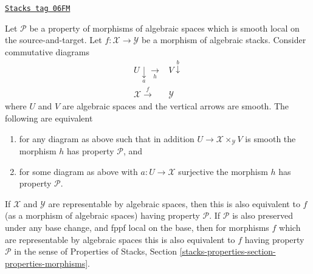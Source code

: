 \begin{lemma}
\label{stacks-morphisms-lemma-local-source-target}
\href{https://stacks.math.columbia.edu/tag/06FM}{\texttt{Stacks tag 06FM}}

Let $\mathcal{P}$ be a property of morphisms of algebraic spaces
which is smooth local on the source-and-target.
Let $f : \mathcal{X} \to \mathcal{Y}$ be a morphism of algebraic stacks.
Consider commutative diagrams
$$
\begin{array}{cc}U \underset{a}{\downarrow}\underset{h}{\longrightarrow} & V \overset{b}{\downarrow} \\ \mathcal{X} \overset{f}{\longrightarrow} & \mathcal{Y}\end{array}
$$
where $U$ and $V$ are algebraic spaces and the vertical arrows are smooth.
The following are equivalent
\begin{enumerate}
\item for any diagram as above such that in addition
$U \to \mathcal{X} \times_\mathcal{Y} V$ is smooth
the morphism $h$ has property $\mathcal{P}$, and
\item for some diagram as above with $a : U \to \mathcal{X}$ surjective
the morphism $h$ has property $\mathcal{P}$.
\end{enumerate}
If $\mathcal{X}$ and $\mathcal{Y}$ are representable by algebraic spaces,
then this is also equivalent to $f$ (as a morphism of algebraic spaces)
having property $\mathcal{P}$. If $\mathcal{P}$ is also preserved under
any base change, and fppf local on the base, then for morphisms $f$
which are representable by algebraic spaces this
is also equivalent to $f$ having property $\mathcal{P}$ in the sense
of
Properties of Stacks,
Section \ref{stacks-properties-section-properties-morphisms}.
\end{lemma}


